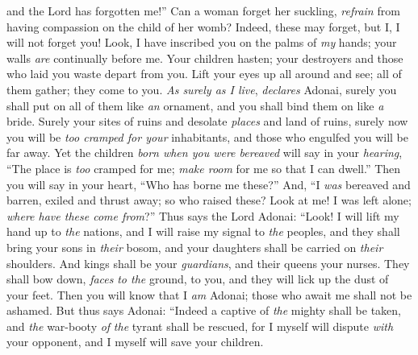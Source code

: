 \begin{biblechapter}
and the Lord has forgotten me!”
\verse Can a woman forget her suckling, 
\textit{refrain} from having compassion on the child of her womb? 
Indeed, these may forget, 
but I, I will not forget you!
\verse Look, I have inscribed you on the palms of \textit{my} hands; 
your walls \textit{are} continually before me.
\verse Your children hasten; 
your destroyers and those who laid you waste depart from you.
\verse Lift your eyes up all around and see; 
all of them gather; they come to you. 
\textit{As surely as I live}, 
\textit{declares} Adonai, 
surely you shall put on all of them like \textit{an} ornament, 
and you shall bind them on like \textit{a} bride.
\verse Surely your sites of ruins and desolate \textit{places} and land of ruins, surely now you will be \textit{too cramped for your} inhabitants, 
and those who engulfed you will be far away.
\verse Yet the children \textit{born when you were bereaved} will say in your \textit{hearing}, “The place is \textit{too} cramped for me; 
\textit{make room} for me so that I can dwell.”
\verse Then you will say in your heart, “Who has borne me these?” 
And, “I \textit{was} bereaved and barren, 
exiled and thrust away; 
so who raised these? 
Look at me! I was left alone; 
\textit{where have these come from}?”
\verse Thus says the Lord Adonai:
\verse “Look! I will lift my hand up to \textit{the} nations, 
and I will raise my signal to \textit{the} peoples, 
and they shall bring your sons in \textit{their} bosom, 
and your daughters shall be carried on \textit{their} shoulders.
\verse And kings shall be your \textit{guardians}, 
and their queens your nurses. 
They shall bow down, \textit{faces} \textit{to the} ground, to you, 
and they will lick up the dust of your feet. 
Then you will know that I \textit{am} Adonai; 
those who await me shall not be ashamed.
\verse But thus says Adonai:
\verse “Indeed a captive of \textit{the} mighty shall be taken, 
and \textit{the} war-booty \textit{of} \textit{the} tyrant shall be rescued, 
for I myself will dispute \textit{with} your opponent, 
and I myself will save your children.
\end{biblechapter}

